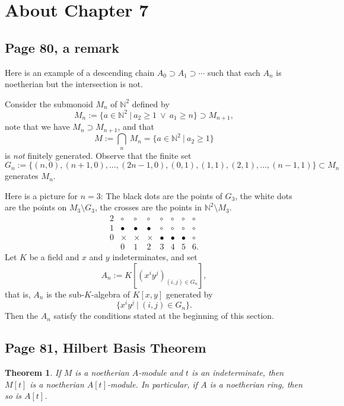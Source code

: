 \documentclass[parskip=half,fontsize=12pt]{scrartcl}%
\newtheorem{thm}{Theorem}%
\begin{document}
\section{About Chapter 7}%

\subsection{Page 80, a remark}%

Here is an example of a descending chain $A_0\supset A_1\supset\cdots$ such that each $A_n$ is noetherian but the intersection is not.

Consider the submonoid $M_n$ of $\mathbb N^2$ defined by 
$$
M_n:=\{a\in\mathbb N^2\ |\ a_2\ge1\ \lor\ a_1\ge n\}\supset M_{n+1},
$$ 
note that we have $M_n\supset M_{n+1}$, and that 
$$
M:=\bigcap_n\ M_n=\{a\in\mathbb N^2\ |\ a_2\ge1\}
$$ 
is \emph{not} finitely generated. Observe that the finite set 
$$
G_n:=\{(n,0),(n+1,0),\dots,(2n-1,0),(0,1),(1,1),(2,1),\dots,(n-1,1)\}\subset M_n
$$ 
generates $M_n$. 

Here is a picture for $n=3$: The black dots are the points of $G_3$, the white dots are the points on $M_3\setminus G_3$, the crosses are the points in $\mathbb N^2\setminus M_3$.
$$
\begin{matrix}
2&\circ&\circ&\circ&\circ&\circ&\circ&\circ\\ 
1&\bullet&\bullet&\bullet&\circ&\circ&\circ&\circ\\ 
0&\times&\times&\times&\bullet&\bullet&\bullet&\circ\\ 
&0&1&2&3&4&5&6.
\end{matrix}
$$
Let $K$ be a field and $x$ and $y$ indeterminates, and set  
$$
A_n:=K\left[(x^iy^j)_{(i,j)\in G_n}\right],
$$ 
that is, $A_n$ is the sub-$K$-algebra of $K[x,y]$ generated by 
$$
\{x^iy^j\ |\ (i,j)\in G_n\}.
$$ 
Then the $A_n$ satisfy the conditions stated at the beginning of this section.

\subsection{Page 81, Hilbert Basis Theorem}%

\begin{thm}\label{hbt}
If $M$ is a noetherian $A$-module and $t$ is an indeterminate, then $M[t]$ is a noetherian $A[t]$-module. In particular, if $A$ is a noetherian ring, then so is $A[t]$.
\end{thm}
\end{document}

